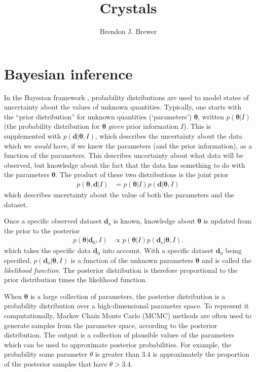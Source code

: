 \documentclass[a4paper, 12pt]{article}
\title{Crystals}
\author{Brendon J. Brewer}
\date{}
\newcommand{\params}{\boldsymbol{\theta}}
\newcommand{\data}{\boldsymbol{d}}
\newcommand{\info}{I}
\begin{document}
\maketitle


\setlength{\parindent}{0pt}
\setlength{\parskip}{8pt}

\section{Bayesian inference}
In the Bayesian framework
\citep{gregory2005bayesian, o2004kendall, sivia2006data},
probability distributions are used to model
states of uncertainty about the values of unknown quantities.
Typically, one starts with the ``prior distribution''
for unknown quantities (`parameters') $\params$, written $p(\params | \info)$
(the probability distribution for $\params$ {\em given} prior information
$\info$). This is supplemented with $p(\data | \params, \info)$,
which describes the uncertainty about the data which we {\em would} have,
if we knew the parameters (and the prior information), as a function of
the parameters. This describes uncertainty about what data will be observed,
but knowledge about the fact that the data has something to do with the
parameters $\params$.
The
product of these two distributions is the joint prior
\begin{align}
p(\params, \data | \info) &= p(\params | \info)p(\data | \params, \info)
\end{align}
which describes uncertainty about the value of both the parameters and the
dataset.

Once a specific observed dataset $\data_o$ is known, knowledge about
$\params$ is updated from the prior to the posterior
\begin{align}
p(\params | \data_0, \info) &\propto
    p(\params | \info)p(\data_o | \params, \info).
\end{align}
which takes the specific data $\data_0$ into account. With a specific dataset
$\data_0$ being specified, $p(\data_o | \params,\info)$ is a function of the
unknown parameters $\params$ and is called the {\em likelihood function}.
The posterior distribution is therefore proportional to the prior distribution
times the likelihood function.

When $\params$ is a large collection of parameters, the posterior distribution
is a probability distribution over a high-dimensional parameter space. To
represent it computationally, Markov Chain Monte Carlo (MCMC) methods are
often used to generate samples from the parameter space, according to the
posterior distribution. The output is a collection of plausible values of the
parameters which can be used to approximate posterior probabilities.
For example, the probability some parameter $\theta$ is greater than 3.4
is approximately the proportion of the posterior samples that have
$\theta > 3.4$.
\end{document}
